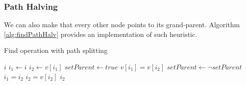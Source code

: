 \subsubsection{Path Halving}
We can also make that every other node points to its grand-parent. Algorithm \ref{alg:findPathHalv} provides an implementation of such heuristic.


\begin{algorithm}
    \caption{Find operation with path splitting}\label{alg:findPathHalv}
    \begin{algorithmic}
        \State \Return $i$
        \EndIf
        \State $i_1 \gets i$
        \State $i_2 \gets v[i_1]$
        \State $setParent \gets true$
        \State $v[i_1] = v[i_2]$
        \EndIf
        \State $setParent \gets \neg setParent$
        \State $i_1 = i_2$
        \State $i_2 = v[i_2]$
        \EndWhile
        \State \Return $i_2$
        \EndFunction
    \end{algorithmic}
\end{algorithm}
